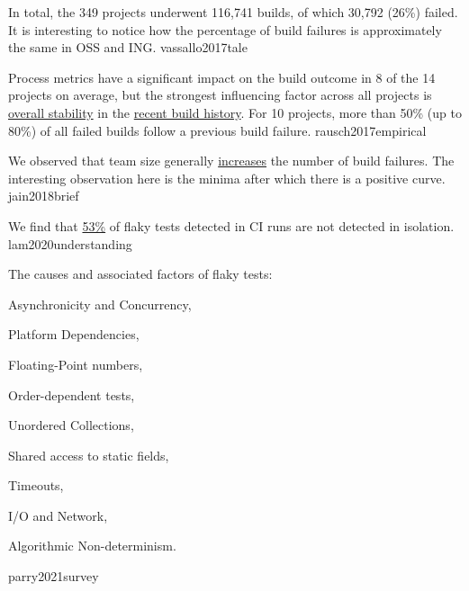\documentclass{article}
\begin{document}

  {In total, the 349 projects underwent 116,741 builds, of which 30,792 (26\%) failed. It is interesting to notice how the percentage of build failures is approximately the same in OSS and ING.}
  {vassallo2017tale}

  {Process metrics have a significant impact on the build outcome in 8 of the 14 projects on average, but the strongest influencing factor across all projects is \ul{overall stability} in the \ul{recent build history}. For 10 projects, more than 50\% (up to 80\%) of all failed builds follow a previous build failure.}
  {rausch2017empirical}

  {We observed that team size generally \ul{increases} the number of build failures. The interesting observation here is the minima after which there is a positive curve.}
  {jain2018brief}

  {We find that \ul{53\%} of flaky tests detected in CI runs are not detected in isolation.}
  {lam2020understanding}

  {The causes and associated factors of flaky tests: \begin{enumerate*}
    \item Asynchronicity and Concurrency,
    \item Platform Dependencies,
    \item Floating-Point numbers,
    \item Order-dependent tests,
    \item Unordered Collections,
    \item Shared access to static fields,
    \item Timeouts,
    \item I/O and Network,
    \item Algorithmic Non-determinism.
  \end{enumerate*}}
  {parry2021survey}
\end{document}
